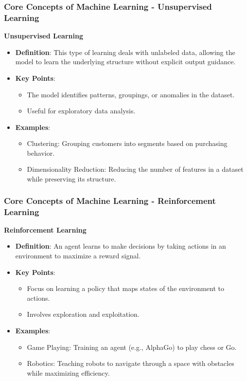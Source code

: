 \documentclass{beamer}
\begin{document}
\begin{frame}[fragile]
    \frametitle{Core Concepts of Machine Learning - Unsupervised Learning}
    \textbf{Unsupervised Learning}
    \begin{itemize}
        \item \textbf{Definition}: This type of learning deals with unlabeled data, allowing the model to learn the underlying structure without explicit output guidance.
        \item \textbf{Key Points}:
        \begin{itemize}
            \item The model identifies patterns, groupings, or anomalies in the dataset.
            \item Useful for exploratory data analysis.
        \end{itemize}
        \item \textbf{Examples}:
        \begin{itemize}
            \item Clustering: Grouping customers into segments based on purchasing behavior.
            \item Dimensionality Reduction: Reducing the number of features in a dataset while preserving its structure.
        \end{itemize}
    \end{itemize}
\end{frame}

\begin{frame}[fragile]
    \frametitle{Core Concepts of Machine Learning - Reinforcement Learning}
    \textbf{Reinforcement Learning}
    \begin{itemize}
        \item \textbf{Definition}: An agent learns to make decisions by taking actions in an environment to maximize a reward signal.
        \item \textbf{Key Points}:
        \begin{itemize}
            \item Focus on learning a policy that maps states of the environment to actions.
            \item Involves exploration and exploitation.
        \end{itemize}
        \item \textbf{Examples}:
        \begin{itemize}
            \item Game Playing: Training an agent (e.g., AlphaGo) to play chess or Go.
            \item Robotics: Teaching robots to navigate through a space with obstacles while maximizing efficiency.
        \end{itemize}
    \end{itemize}
\end{frame}
\end{document}
